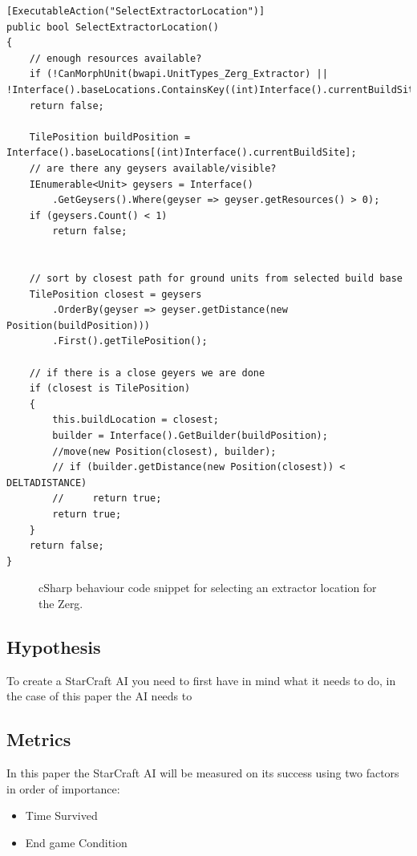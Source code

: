 \documentclass[journal]{IEEEtran}
\begin{document}
\begin{lstlisting}
[ExecutableAction("SelectExtractorLocation")]
public bool SelectExtractorLocation()
{
    // enough resources available?
    if (!CanMorphUnit(bwapi.UnitTypes_Zerg_Extractor) || !Interface().baseLocations.ContainsKey((int)Interface().currentBuildSite))
    return false;
    
    TilePosition buildPosition = Interface().baseLocations[(int)Interface().currentBuildSite];
    // are there any geysers available/visible?
    IEnumerable<Unit> geysers = Interface()
        .GetGeysers().Where(geyser => geyser.getResources() > 0);
    if (geysers.Count() < 1)
        return false;


    // sort by closest path for ground units from selected build base
    TilePosition closest = geysers
        .OrderBy(geyser => geyser.getDistance(new Position(buildPosition)))
        .First().getTilePosition();

    // if there is a close geyers we are done
    if (closest is TilePosition)
    {
        this.buildLocation = closest;
        builder = Interface().GetBuilder(buildPosition);
        //move(new Position(closest), builder);
        // if (builder.getDistance(new Position(closest)) < DELTADISTANCE)
        //     return true;
        return true;
    }
    return false;
}
\end{lstlisting}
\begin{figure}[h]
	\centering
	\caption{cSharp behaviour code snippet for selecting an extractor location for the Zerg.}
	\label{Fig2}
\end{figure}

\subsection{Hypothesis}

To create a StarCraft AI you need to first have in mind what it needs to do, in the case of this paper the AI needs to 

\subsection{Metrics}
In this paper the StarCraft AI will be measured on its success using two factors in order of importance:
\begin{itemize}
	\item[] \centering Time Survived
	\item[] End game Condition
\end{itemize}
\end{document}
